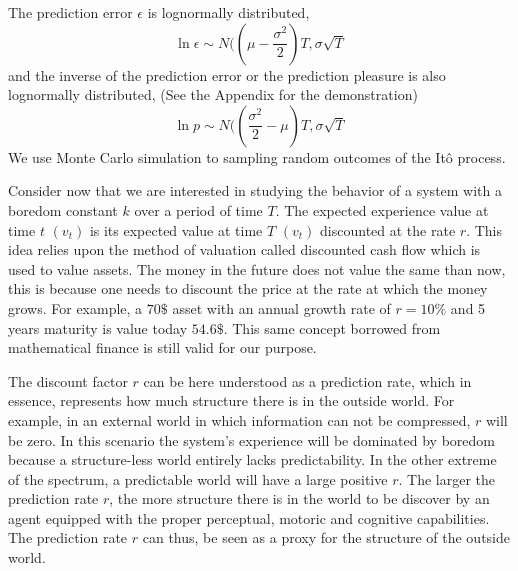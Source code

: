 \documentclass[11pt, onecolumn]{article}
\begin{document}
The prediction error $\epsilon$ is lognormally distributed, 
\begin{equation*}
\ln \epsilon \sim N((\mu -\frac{\sigma^2}{2})T, \sigma \sqrt{T}
\end{equation*}
and the inverse of the prediction error or the prediction pleasure is also lognormally distributed, (See the Appendix for the demonstration)
\begin{equation*}
\ln p \sim N((\frac{\sigma^2}{2} - \mu)T, \sigma \sqrt{T}
\end{equation*}
We use Monte Carlo simulation to sampling random outcomes of the It\^{o} process.

Consider now that we are interested in studying the behavior of a system with a boredom constant $k$ over a period of time $T$. The expected experience value at time $t$ $(v_t)$ is its expected value at time $T$ $(v_t)$ discounted at the rate $r$. This idea relies upon the method of valuation called discounted cash flow which is used to value assets. The money in the future does not value the same than now, this is because one needs to discount the price at the rate at which the money grows. For example, a $70\$$ asset with an annual growth rate of $r=10\%$ and 5 years maturity is value today $54.6\$$. This same concept borrowed from mathematical finance is still valid for our purpose.

The discount factor $r$ can be here understood as a prediction rate, which in essence, represents how much structure there is in the outside world. For example, in an external world in which information can not be compressed, $r$ will be zero. In this scenario the system's experience will be dominated by boredom because a structure-less world entirely lacks predictability. 
In the other extreme of the spectrum, a predictable world will have a large positive $r$. The larger the prediction rate $r$, the more structure there is in the world to be discover by an agent equipped with the proper perceptual, motoric and cognitive capabilities. The prediction rate $r$ can thus, be seen as a proxy for the structure of the outside world. 
\end{document}
